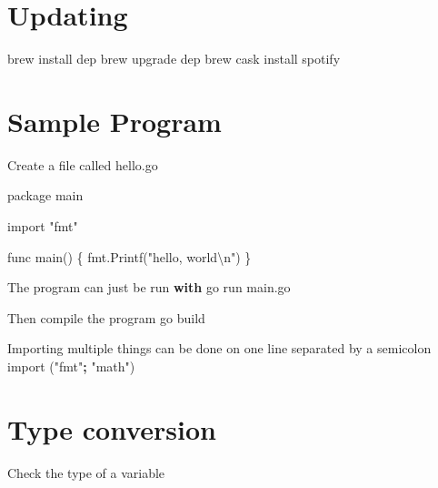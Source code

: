 \documentclass[]{book}
\newenvironment{Shaded}{\begin{snugshade}}{\end{snugshade}}
\newcommand{\CharTok}[1]{\textcolor[rgb]{0.31,0.60,0.02}{#1}}
\newcommand{\StringTok}[1]{\textcolor[rgb]{0.31,0.60,0.02}{#1}}
\newcommand{\ImportTok}[1]{#1}
\newcommand{\VariableTok}[1]{\textcolor[rgb]{0.00,0.00,0.00}{#1}}
\newcommand{\ControlFlowTok}[1]{\textcolor[rgb]{0.13,0.29,0.53}{\textbf{#1}}}
\newcommand{\OperatorTok}[1]{\textcolor[rgb]{0.81,0.36,0.00}{\textbf{#1}}}
\newcommand{\BuiltInTok}[1]{#1}
\newcommand{\ExtensionTok}[1]{#1}
\newcommand{\NormalTok}[1]{#1}
\begin{document}
\begin{Shaded}
\end{Shaded}

\section{Updating}\label{updating}

\begin{Shaded}
\begin{Highlighting}[]
\ExtensionTok{brew}\NormalTok{ install dep}
\ExtensionTok{brew}\NormalTok{ upgrade dep}
\ExtensionTok{brew}\NormalTok{ cask install spotify}
\end{Highlighting}
\end{Shaded}

\section{Sample Program}\label{sample-program}

Create a file called hello.go

\begin{Shaded}
\begin{Highlighting}[]
\NormalTok{package main}

\ImportTok{import} \StringTok{"fmt"}

\NormalTok{func main() \{}
\NormalTok{    fmt.Printf(}\StringTok{"hello, world}\CharTok{\textbackslash{}n}\StringTok{"}\NormalTok{)}
\NormalTok{\}}

\NormalTok{The program can just be run }\ControlFlowTok{with}
\NormalTok{go run main.go}

\NormalTok{Then }\BuiltInTok{compile}\NormalTok{ the program}
\NormalTok{    go build}

\NormalTok{Importing multiple things can be done on one line separated by a semicolon}
    \ImportTok{import}\NormalTok{ (}\StringTok{"fmt"}\OperatorTok{;} \StringTok{"math"}\NormalTok{)}
\end{Highlighting}
\end{Shaded}

\section{Type conversion}\label{type-conversion}

Check the type of a variable
\end{document}

